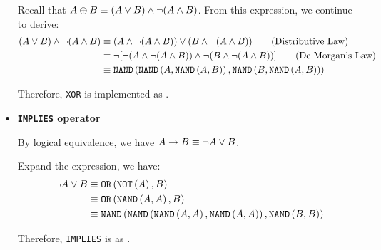 \documentclass[answers]{exam}
\begin{document}
\begin{questions}
\begin{parts}
\begin{solution}
\begin{itemize}
                Recall that $A\oplus B
                \equiv (A\lor B)\land\neg(A\land B)$. From this expression, we continue to derive:
                \begin{align*}
                    (A\lor B)\land\neg(A\land B)
                    &\equiv (A\land\neg(A\land B))\lor(B\land\neg(A\land B)) \qquad\text{(Distributive Law)}\\
                    &\equiv \neg[\neg(A\land\neg(A\land B))\land\neg(B\land\neg(A\land B))] \qquad\text{(De Morgan's Law)}\\
                    &\equiv \texttt{NAND}\left(
                        \texttt{NAND}\left(A, \texttt{NAND}\left(A, B\right)\right)
                    , 
                        \texttt{NAND}\left(B, \texttt{NAND}\left(A, B\right)\right)
                    \right)
                \end{align*}

                Therefore, \texttt{XOR} is implemented as .

                \item \textbf{\texttt{IMPLIES} operator}
                
                By logical equivalence, we have $A \rightarrow B \equiv \neg A \lor B$.

                Expand the expression, we have:
                \begin{align*}
                    \neg A\lor B
                    &\equiv \texttt{OR}\left(\texttt{NOT}\left(A\right), B\right) \\
                    &\equiv \texttt{OR}\left(\texttt{NAND}\left(A, A\right), B\right) \\
                    &\equiv \texttt{NAND}\left(
                        \texttt{NAND}\left(\texttt{NAND}\left(A, A\right), \texttt{NAND}\left(A, A\right)\right)
                    , 
                        \texttt{NAND}\left(B, B\right)
                    \right)
                \end{align*}

                Therefore, \texttt{IMPLIES} is as .
            \end{itemize}
        \end{solution}
    \end{parts}


\end{questions}
\end{document}
